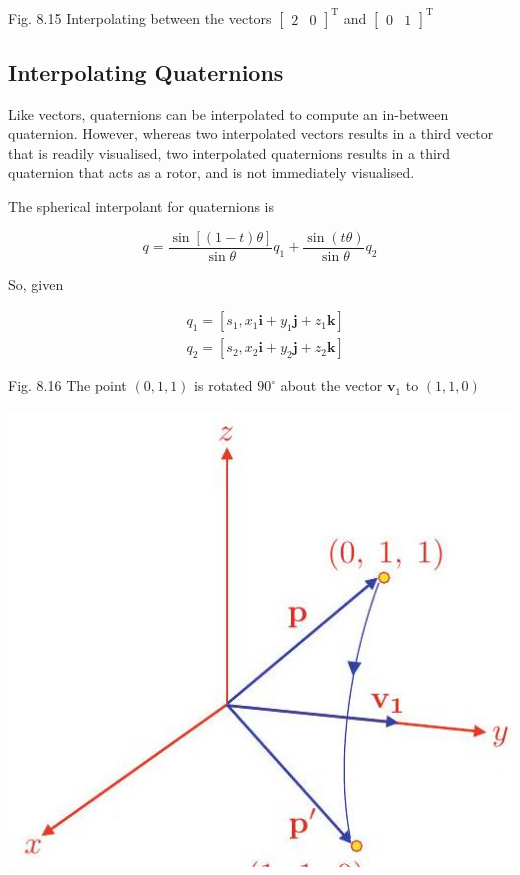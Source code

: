 \documentclass[10pt]{article}
\begin{document}
Fig. 8.15 Interpolating between the vectors $\left[\begin{array}{ll}2 & 0\end{array}\right]^{\mathrm{T}}$ and $\left[\begin{array}{ll}0 & 1\end{array}\right]^{\mathrm{T}}$

\subsection{Interpolating Quaternions}
Like vectors, quaternions can be interpolated to compute an in-between quaternion. However, whereas two interpolated vectors results in a third vector that is readily visualised, two interpolated quaternions results in a third quaternion that acts as a rotor, and is not immediately visualised.

The spherical interpolant for quaternions is

$$
q=\frac{\sin [(1-t) \theta]}{\sin \theta} q_{1}+\frac{\sin (t \theta)}{\sin \theta} q_{2}
$$

So, given

$$
\begin{aligned}
& q_{1}=\left[s_{1}, x_{1} \mathbf{i}+y_{1} \mathbf{j}+z_{1} \mathbf{k}\right] \\
& q_{2}=\left[s_{2}, x_{2} \mathbf{i}+y_{2} \mathbf{j}+z_{2} \mathbf{k}\right]
\end{aligned}
$$

Fig. 8.16 The point $(0,1,1)$ is rotated $90^{\circ}$ about the vector $\mathbf{v}_{1}$ to $(1,1,0)$

\begin{center}
\includegraphics[max width=\textwidth]{2023_04_20_41f1ceac5a31dc7d1b59g-168}
\end{center}
\end{document}

